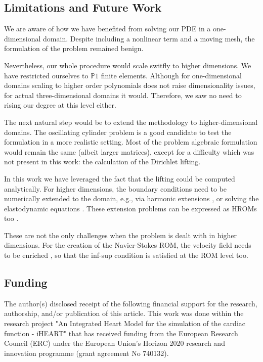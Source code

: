 \documentclass[thesis.tex]{subfiles}
\begin{document}
\subsection{Limitations and Future Work}
We are aware of how we have benefited from solving our PDE in a one-dimensional domain.
Despite including a nonlinear term and a moving mesh,
the formulation of the problem remained benign. 

Nevertheless, our whole procedure would scale switfly to higher dimensions.
We have restricted ourselves to $\mathbb{P}1$ finite elements.
Although for one-dimensional domains scaling to higher order polynomials does not
raise dimensionality issues, for actual three-dimensional domains it would.
Therefore, we saw no need to rising our degree at this level either.

The next natural step would be to extend the methodology to higher-dimensional domains.
The oscillating cylinder problem is a good candidate 
to test the formulation in a more realistic setting.
Most of the problem algebraic formulation would remain the same (albeit larger matrices),
except for a difficulty which was not present in this work: 
the calculation of the Dirichlet lifting. 

In this work we have leveraged the fact that the lifting could be computed analytically.
For higher dimensions, the boundary conditions need to be numerically extended to the domain, 
e.g., via harmonic extensions
\cite{formaggiaALE},
or solving the elastodynamic equations
\cite{1995_farhat_elasticEquations}.
These extension problems can be expressed as HROMs too \cite{Santo_Manzoni_2019}.

These are not the only challenges when the problem is dealt with in higher dimensions.
For the creation of the Navier-Stokes ROM, the velocity field needs to be enriched
\cite{supremizers},
so that the inf-sup condition is satisfied at the ROM level too.

\newpage
\subsection*{Funding}
The author(s) disclosed receipt of the following financial support for the research, 
authorship, and/or publication of this article.
This work was done
within the research project 
"An Integrated Heart Model for the simulation of the cardiac function - iHEART" 
that has received funding from the European Research Council (ERC) 
under the European Union’s Horizon 2020 research and innovation programme 
(grant agreement No 740132).
\end{document}
